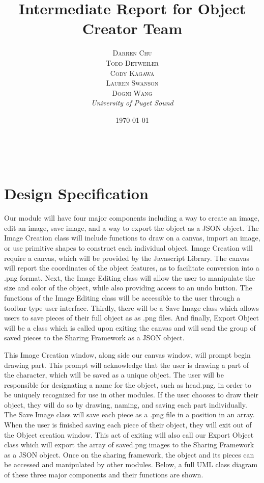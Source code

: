 \documentclass[a4paper, 11pt]{article} %
\title{\textbf{Intermediate Report for Object Creator Team}}
\author{\textsc{Darren Chu\\Todd Detweiler\\Cody Kagawa\\Lauren Swanson\\Dogni Wang} %
\\{\textit{University of Puget Sound}}} %
\date{\today} %
\makeatletter
\renewcommand{\maketitle}{ %
\begin{flushright} %
{\LARGE\@title} %

\vspace{50pt} %

{\large\@author} %
\\\@date %

\vspace{40pt} %
\end{flushright}
}
\makeatother
\begin{document}
\maketitle %


\section*{Design Specification}

Our module will have four major components including a way to create an image, edit an image, save image, and a way to export the object as a JSON object. The Image Creation class will include functions to draw on a canvas, import an image, or use primitive shapes to construct each individual object. Image Creation will require a canvas, which will be provided by the Javascript Library. The canvas will report the coordinates of the object features, as to facilitate conversion into a .png format. Next, the Image Editing class will allow the user to manipulate the size and color of the object, while also providing access to an undo button. The functions of the Image Editing class will be accessible to the user through a toolbar type user interface. Thirdly, there will be a Save Image class which allows users to save pieces of their full object as as .png files. And finally, Export Object will be a class which is called upon exiting the canvas and will send the group of saved pieces to the Sharing Framework as a JSON object.

This Image Creation window, along side our canvas window, will prompt begin drawing part. This prompt will acknowledge that the user is drawing a part of the character, which will be saved as a unique object. The user will be responsible for designating a name for the object, such as head.png, in order to be uniquely recognized for use in other modules. If the user chooses to draw their object, they will do so by drawing, naming, and saving each part individually. The Save Image class will save each piece as a .png file in a position in an array. When the user is finished saving each piece of their object, they will exit out of the Object creation window. This act of exiting will also call our Export Object class which will export the array of saved.png images to the Sharing Framework as a JSON object. Once on the sharing framework, the object and its pieces can be accessed and manipulated by other modules. Below, a full UML class diagram of these three major components and their functions are shown.
\end{document}
